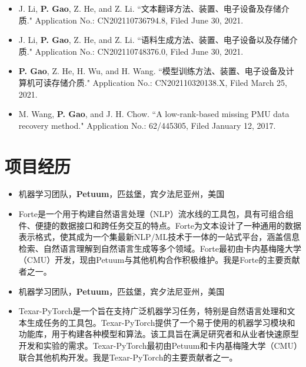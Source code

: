 \documentclass{resume}
\begin{document}
\begin{itemize}[parsep=0.2ex]
\item {J. Li, {\bf P. Gao}, Z. He, and Z. Li. ``文本翻译方法、装置、电子设备及存储介质." Application No.: CN202110736794.8, Filed June 30, 2021.}

\item {J. Li, {\bf P. Gao}, Z. He, and Z. Li. ``语料生成方法、装置、电子设备以及存储介质." Application No.: CN202110748376.0, Filed June 30, 2021.}

\item {{\bf P. Gao}, Z. He, H. Wu, and H. Wang. ``模型训练方法、装置、电子设备及计算机可读存储介质." Application No.: CN202110320138.X, Filed March 25, 2021.}

\item {M. Wang, {\bf P. Gao}, and J. H. Chow. ``A low-rank-based missing PMU data recovery method." Application No.: 62/445305, Filed January 12, 2017.}

\end{itemize}
\fi

\section{项目经历}

\begin{itemize}
\item[] 机器学习团队，\textbf{Petuum}，匹兹堡，宾夕法尼亚州，美国
\item Forte是一个用于构建自然语言处理（NLP）流水线的工具包，具有可组合组件、便捷的数据接口和跨任务交互的特点。Forte为文本设计了一种通用的数据表示格式，使其成为一个集最新NLP/ML技术于一体的一站式平台，涵盖信息检索、自然语言理解到自然语言生成等多个领域。Forte最初由卡内基梅隆大学（CMU）开发，现由Petuum与其他机构合作积极维护。我是Forte的主要贡献者之一。
\end{itemize}

\begin{itemize}
\item[] 机器学习团队，\textbf{Petuum}，匹兹堡，宾夕法尼亚州，美国
\item Texar-PyTorch是一个旨在支持广泛机器学习任务，特别是自然语言处理和文本生成任务的工具包。Texar-PyTorch提供了一个易于使用的机器学习模块和功能库，用于构建各种模型和算法。该工具旨在满足研究者和从业者快速原型开发和实验的需求。Texar-PyTorch最初由Petuum和卡内基梅隆大学（CMU）联合其他机构开发。我是Texar-PyTorch的主要贡献者之一。
\end{itemize}
\end{document}
